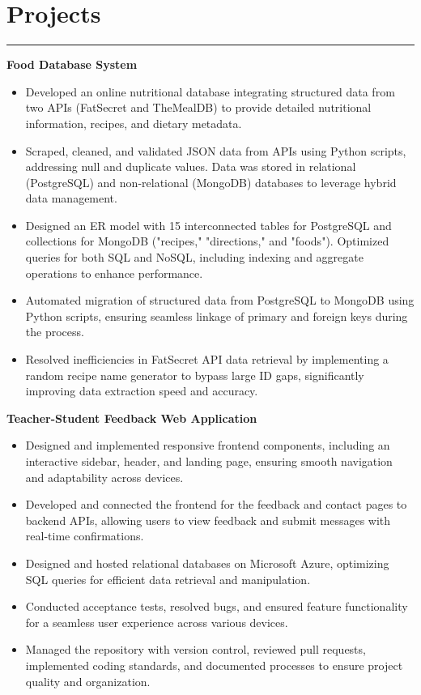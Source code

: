 \documentclass[10pt]{article}
\begin{document}
\section*{Projects}
\vspace{-2mm}
\hrule
\vspace{0mm}

\textbf{Food Database System}
\vspace{-4mm}
\begin{itemize}
    \item Developed an online nutritional database integrating structured data from two APIs (FatSecret and TheMealDB) to provide detailed nutritional information, recipes, and dietary metadata.
    \item Scraped, cleaned, and validated JSON data from APIs using Python scripts, addressing null and duplicate values. Data was stored in relational (PostgreSQL) and non-relational (MongoDB) databases to leverage hybrid data management.
    \item Designed an ER model with 15 interconnected tables for PostgreSQL and collections for MongoDB ("recipes," "directions," and "foods"). Optimized queries for both SQL and NoSQL, including indexing and aggregate operations to enhance performance.
    \item Automated migration of structured data from PostgreSQL to MongoDB using Python scripts, ensuring seamless linkage of primary and foreign keys during the process.
    \item Resolved inefficiencies in FatSecret API data retrieval by implementing a random recipe name generator to bypass large ID gaps, significantly improving data extraction speed and accuracy.
\end{itemize}

\textbf{Teacher-Student Feedback Web Application} 
\vspace{-4mm}
\begin{itemize}[left=0.15in, itemsep=0pt]
    \item Designed and implemented responsive frontend components, including an interactive sidebar, header, and landing page, ensuring smooth navigation and adaptability across devices.
    \item Developed and connected the frontend for the feedback and contact pages to backend APIs, allowing users to view feedback and submit messages with real-time confirmations.
    \item Designed and hosted relational databases on Microsoft Azure, optimizing SQL queries for efficient data retrieval and manipulation.
    \item Conducted acceptance tests, resolved bugs, and ensured feature functionality for a seamless user experience across various devices.
    \item Managed the repository with version control, reviewed pull requests, implemented coding standards, and documented processes to ensure project quality and organization.
\end{itemize}
\end{document}
